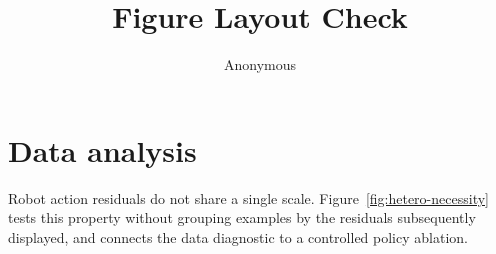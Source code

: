 \documentclass{article}
\title{Figure Layout Check}
\author{Anonymous}
\begin{document}
\maketitle

\clearpage
\section{Data analysis}
Robot action residuals do not share a single scale. Figure~\ref{fig:hetero-necessity}
tests this property without grouping examples by the residuals subsequently
displayed, and connects the data diagnostic to a controlled policy ablation.
\end{document}
